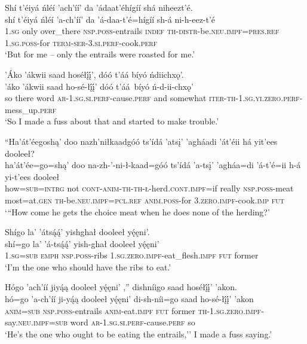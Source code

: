 \ea\label{ex:text2-4-5}
Shí t’éiyá ńléí ’ach’íí’ da ’ádaat’éhígíí shá niheezt’é.\\
\gll shí	t’éiyá	ńléí	’a-ch’íí’	da	’á-daa-t’é=hígíí	sh-á	ni-h-eez-t’é\\
     1.\textsc{sg}	only	over\_there	\textsc{nsp}.\textsc{poss}-entrails		\textsc{indef}	\textsc{th}-\textsc{distr}-be.\textsc{neu}.\textsc{impf}=\textsc{pres}.\textsc{ref}	1.\textsc{sg}.\textsc{poss}-for	\textsc{term}-\textsc{ser}-3.\textsc{si}.\textsc{perf}-cook.\textsc{perf}\\
\glt `But for me -- only the entrails were roasted for me.'
\z

\ea\label{ex:text2-4-6}
’Áko ’ákwii saad hoséłį́į́’, dóó t’áá bíyó ńdiichxǫ’.\\
\gll ’áko	’ákwii	saad	ho-sé-łį́į́’	dóó	t’áá~{bíyó}	ń-d-ii-chxǫ’\\
     so	there	word	\textsc{ar}-1.\textsc{sg}.\textsc{si}.\textsc{perf}-cause.\textsc{perf}	and	somewhat	\textsc{iter}-\textsc{th}-1.\textsc{sg}.\textsc{yi}.\textsc{zero}.\textsc{perf}-mess\_up.\textsc{perf}\\
\glt `So I made a fuss about that and started to make trouble.'
\z

\ea\label{ex:text2-5-1}
``Ha’át’éegoshą’ doo nazh’niłkaadgóó ts’ídá ’atsį’ ’agháadi ’át’éii há yit’ees dooleeł?\\
\gll ha’át’ée=go=shą’	doo	na-zh-’-ni-ł-kaad=góó	ts’ídá	’a-tsį’	’agháa=di	’á-t’é=ii	h-á	yi-t’ees	dooleeł\\
     how=\textsc{sub}=\textsc{intrg}	not	\textsc{cont}-\textsc{anim}-\textsc{th}-\textsc{th}-\textsc{ł}-herd.\textsc{cont}.\textsc{impf}=if	really	\textsc{nsp}.\textsc{poss}-meat	most=at.\textsc{gen}	\textsc{th}-be.\textsc{neu}.\textsc{impf}=\textsc{pcl}.\textsc{ref}	\textsc{anim}.\textsc{poss}-for	3.\textsc{zero}.\textsc{impf}-cook.\textsc{imp}	\textsc{fut}\\
\glt `{``}How come he gets the choice meat when he does none of the herding?'
\z

\ea\label{ex:text2-5-2}
Shígo la’ ’átsą́ą́’ yishghał dooleeł yę́ęni’.\\
\gll shí=go	la’	’á-tsą́ą́’	yish-ghał	dooleeł	yę́ęni’\\
     1.\textsc{sg}=\textsc{sub}	\textsc{emph}	\textsc{nsp}.\textsc{poss}-ribs	1.\textsc{sg}.\textsc{zero}.\textsc{impf}-eat\_flesh.\textsc{impf}	\textsc{fut}	former\\
\glt `I'm the one who should have the ribs to eat.'
\z

\ea\label{ex:text2-5-3}
Hógo ’ach’íí jiyą́ą dooleeł yę́ęni’ ,'' dishníigo saad hoséłį́į́’ ’akon.\\
\gll hó=go	’a-ch’íí	ji-yą́ą	dooleeł	yę́ęni’	di-sh-níi=go	saad	ho-sé-łį́į́’	’akon\\
     \textsc{anim}=\textsc{sub}	\textsc{nsp}.\textsc{poss}-entrails	\textsc{anim}-eat.\textsc{impf}	\textsc{fut}	former	\textsc{th}-1.\textsc{sg}.\textsc{zero}.\textsc{impf}-say.\textsc{neu}.\textsc{impf}=\textsc{sub}	word	\textsc{ar}-1.\textsc{sg}.\textsc{si}.\textsc{perf}-cause.\textsc{perf}	so\\
\glt `He's the one who ought to be eating the entrails,'' I made a fuss saying.'
\z

